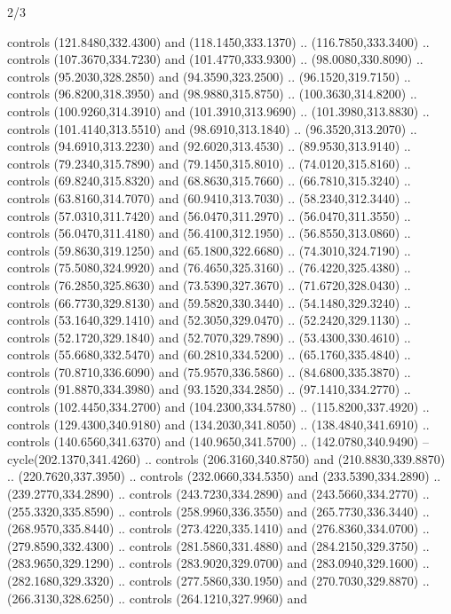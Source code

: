 \begin{flagdescription}{2/3}
\begin{scope}[xshift=0.5\flaglength,yshift=0.5\flagwidth,scale=\stretchfactor]
\begin{scope}[scale=0.001645\flagwidth,yshift=65mm,xshift=-63mm]
\begin{scope}[y=0.80pt, x=0.80pt, yscale=-1,]
\begin{scope}[cm={{1.33333,0.0,0.0,1.33333,(0.0,1e-05)}}]
  controls (121.8480,332.4300) and (118.1450,333.1370) .. (116.7850,333.3400) ..
  controls (107.3670,334.7230) and (101.4770,333.9300) .. (98.0080,330.8090) ..
  controls (95.2030,328.2850) and (94.3590,323.2500) .. (96.1520,319.7150) ..
  controls (96.8200,318.3950) and (98.9880,315.8750) .. (100.3630,314.8200) ..
  controls (100.9260,314.3910) and (101.3910,313.9690) .. (101.3980,313.8830) ..
  controls (101.4140,313.5510) and (98.6910,313.1840) .. (96.3520,313.2070) ..
  controls (94.6910,313.2230) and (92.6020,313.4530) .. (89.9530,313.9140) ..
  controls (79.2340,315.7890) and (79.1450,315.8010) .. (74.0120,315.8160) ..
  controls (69.8240,315.8320) and (68.8630,315.7660) .. (66.7810,315.3240) ..
  controls (63.8160,314.7070) and (60.9410,313.7030) .. (58.2340,312.3440) ..
  controls (57.0310,311.7420) and (56.0470,311.2970) .. (56.0470,311.3550) ..
  controls (56.0470,311.4180) and (56.4100,312.1950) .. (56.8550,313.0860) ..
  controls (59.8630,319.1250) and (65.1800,322.6680) .. (74.3010,324.7190) ..
  controls (75.5080,324.9920) and (76.4650,325.3160) .. (76.4220,325.4380) ..
  controls (76.2850,325.8630) and (73.5390,327.3670) .. (71.6720,328.0430) ..
  controls (66.7730,329.8130) and (59.5820,330.3440) .. (54.1480,329.3240) ..
  controls (53.1640,329.1410) and (52.3050,329.0470) .. (52.2420,329.1130) ..
  controls (52.1720,329.1840) and (52.7070,329.7890) .. (53.4300,330.4610) ..
  controls (55.6680,332.5470) and (60.2810,334.5200) .. (65.1760,335.4840) ..
  controls (70.8710,336.6090) and (75.9570,336.5860) .. (84.6800,335.3870) ..
  controls (91.8870,334.3980) and (93.1520,334.2850) .. (97.1410,334.2770) ..
  controls (102.4450,334.2700) and (104.2300,334.5780) .. (115.8200,337.4920) ..
  controls (129.4300,340.9180) and (134.2030,341.8050) .. (138.4840,341.6910) ..
  controls (140.6560,341.6370) and (140.9650,341.5700) .. (142.0780,340.9490) --
  cycle(202.1370,341.4260) .. controls (206.3160,340.8750) and
  (210.8830,339.8870) .. (220.7620,337.3950) .. controls (232.0660,334.5350) and
  (233.5390,334.2890) .. (239.2770,334.2890) .. controls (243.7230,334.2890) and
  (243.5660,334.2770) .. (255.3320,335.8590) .. controls (258.9960,336.3550) and
  (265.7730,336.3440) .. (268.9570,335.8440) .. controls (273.4220,335.1410) and
  (276.8360,334.0700) .. (279.8590,332.4300) .. controls (281.5860,331.4880) and
  (284.2150,329.3750) .. (283.9650,329.1290) .. controls (283.9020,329.0700) and
  (283.0940,329.1600) .. (282.1680,329.3320) .. controls (277.5860,330.1950) and
  (270.7030,329.8870) .. (266.3130,328.6250) .. controls (264.1210,327.9960) and

\end{scope}
\end{scope}
\end{scope}
\end{scope}
\end{flagdescription}
